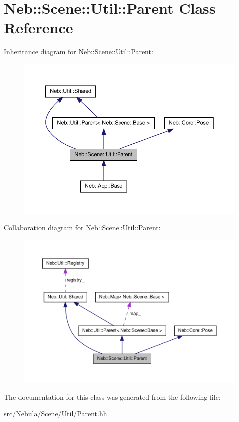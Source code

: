 \hypertarget{classNeb_1_1Scene_1_1Util_1_1Parent}{\section{\-Neb\-:\-:\-Scene\-:\-:\-Util\-:\-:\-Parent \-Class \-Reference}
\label{classNeb_1_1Scene_1_1Util_1_1Parent}
}


\-Inheritance diagram for \-Neb\-:\-:\-Scene\-:\-:\-Util\-:\-:\-Parent\-:\nopagebreak
\begin{figure}[H]
\begin{center}
\leavevmode
\includegraphics[width=350pt]{classNeb_1_1Scene_1_1Util_1_1Parent__inherit__graph}
\end{center}
\end{figure}


\-Collaboration diagram for \-Neb\-:\-:\-Scene\-:\-:\-Util\-:\-:\-Parent\-:\nopagebreak
\begin{figure}[H]
\begin{center}
\leavevmode
\includegraphics[width=350pt]{classNeb_1_1Scene_1_1Util_1_1Parent__coll__graph}
\end{center}
\end{figure}


\-The documentation for this class was generated from the following file\-:\begin{DoxyCompactItemize}
\item 
src/\-Nebula/\-Scene/\-Util/\-Parent.\-hh\end{DoxyCompactItemize}
